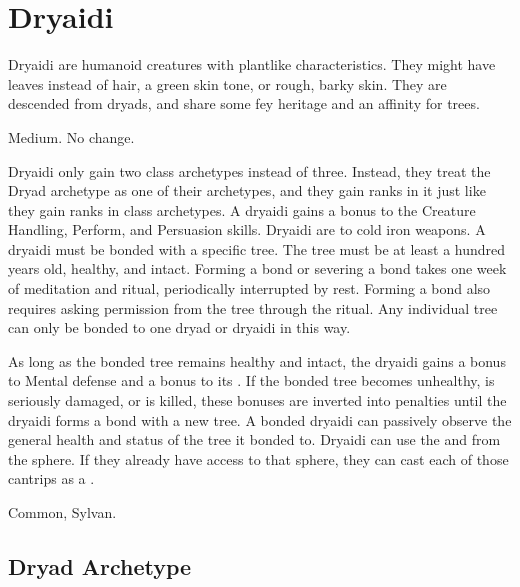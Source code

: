 \section{Dryaidi}

Dryaidi are humanoid creatures with plantlike characteristics.
They might have leaves instead of hair, a green skin tone, or rough, barky skin.
They are descended from dryads, and share some fey heritage and an affinity for trees.

 Medium.
 No change.
\begin{itemize}
	 Dryaidi only gain two class archetypes instead of three.
	      Instead, they treat the Dryad archetype as one of their archetypes, and they gain ranks in it just like they gain ranks in class archetypes.
	 A dryaidi gains a  bonus to the Creature Handling, Perform, and Persuasion skills.
	 Dryaidi are \vulnerable to cold iron weapons.
	 A dryaidi must be bonded with a specific tree.
	      The tree must be at least a hundred years old, healthy, and intact.
	      Forming a bond or severing a bond takes one week of meditation and ritual, periodically interrupted by rest.
	      Forming a bond also requires asking permission from the tree through the ritual.
	      Any individual tree can only be bonded to one dryad or dryaidi in this way.

	      As long as the bonded tree remains healthy and intact, the dryaidi gains a  bonus to Mental defense and a  bonus to its .
	      If the bonded tree becomes unhealthy, is seriously damaged, or is killed, these bonuses are inverted into penalties until the dryaidi forms a bond with a new tree.
	      A bonded dryaidi can passively observe the general health and status of the tree it bonded to.
	 Dryaidi can use the  and   from the  sphere.
	      If they already have access to that sphere, they can cast each of those cantrips as a .
\end{itemize}
 Common, Sylvan.

\subsection{Dryad Archetype}

